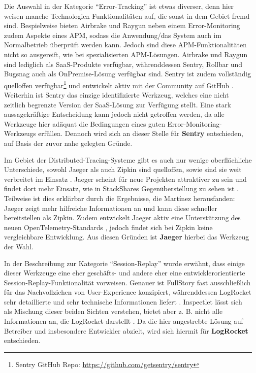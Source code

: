 

Die Auswahl in der Kategorie \enquote{Error-Tracking} ist etwas diverser, denn hier weisen manche Technologien Funktionalitäten auf, die sonst in dem Gebiet fremd sind. Bespielweise bieten Airbrake und Raygun neben einem Error-Monitoring zudem Aspekte eines APM, sodass die Anwendung/das System auch im Normalbetrieb überprüft werden kann. Jedoch sind diese APM-Funktionalitäten nicht so ausgereift, wie bei spezialisierten APM-Lösungen. Airbrake und Raygun sind lediglich als SaaS-Produkte verfügbar, währenddessen Sentry, Rollbar und Bugsnag auch als OnPremise-Lösung verfügbar sind. Sentry ist zudem vollständig quelloffen verfügbar\footnote{Sentry GitHub Repo: \url{https://github.com/getsentry/sentry}} und entwickelt aktiv mit der Community auf GitHub \cite{GitHub}. Weiterhin ist Sentry das einzige identifizierte Werkzeug, welches eine nicht zeitlich begrenzte Version der SaaS-Lösung zur Verfügung stellt. Eine stark aussagekräftige Entscheidung kann jedoch nicht getroffen werden, da alle Werkzeuge hier adäquat die Bedingungen eines guten Error-Monitoring-Werkzeugs erfüllen. Dennoch wird sich an dieser Stelle für \textbf{Sentry} entschieden, auf Basis der zuvor nahe gelegten Gründe.



Im Gebiet der Distributed-Tracing-Systeme gibt es auch nur wenige oberflächliche Unterschiede, sowohl Jaeger als auch Zipkin sind quelloffen, sowie sind sie weit verbreitet im Einsatz \cite{AnalysisOfDistributedTracingSystemsEffectOnPerformance}. Jaeger scheint für neue Projekten attraktiver zu sein und findet dort mehr Einsatz, wie in StackShares Gegenüberstellung zu sehen ist \cite{StackShareJaegerVsZipkin}. Teilweise ist dies erklärbar durch die Ergebnisse, die Mart{\'i}nez \etal \cite{ComparisonOfE2ETestingToolsForMicroservices} herausfanden: Jaeger zeigt mehr hilfreiche Informationen an und kann diese schneller bereitstellen als Zipkin. Zudem entwickelt Jaeger aktiv eine Unterstützung des neuen OpenTelemetry-Standards \cite{JaegerOpenTelemetry}, jedoch findet sich bei Zipkin keine vergleichbare Entwicklung. Aus diesen Gründen ist \textbf{Jaeger} hierbei das Werkzeug der Wahl.



In der Beschreibung zur Kategorie \enquote{Session-Replay} wurde erwähnt, dass einige dieser Werkzeuge eine eher geschäfts- und andere eher eine entwicklerorientierte Session-Replay-Funktionalität vorweisen. Genauer ist FullStory fast ausschließlich für das Nachvollziehen von User-Experience konzipiert, währenddessen LogRocket sehr detaillierte und sehr technische Informationen liefert \cite{Webalyt}. Inspectlet lässt sich als Mischung dieser beiden Sichten verstehen, bietet aber z. B. nicht alle Informationen an, die LogRocket darstellt  \cite{Webalyt}. Da die hier angestrebte Lösung auf Betreiber und insbesondere Entwickler abzielt, wird sich hiermit für \textbf{LogRocket} entschieden.


